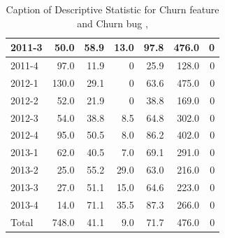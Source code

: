 \documentclass[UKenglish]{ifimaster}  %
\begin{document}
\begin{table}[!htbp]
\begin{adjustwidth}{-1.5cm}{}
{{\begin{tabular}{ | l | r | r | r | r | r | r | }
2011-3 & 50.0 & 58.9 & 13.0 & 97.8 & 476.0 & 0\\ \hline
2011-4 & 97.0 & 11.9 & 0 & 25.9 & 128.0 & 0\\ \hline
2012-1 & 130.0 & 29.1 & 0 & 63.6 & 475.0 & 0\\ \hline
2012-2 & 52.0 & 21.9 & 0 & 38.8 & 169.0 & 0\\ \hline
2012-3 & 54.0 & 38.8 & 8.5 & 64.8 & 302.0 & 0\\ \hline
2012-4 & 95.0 & 50.5 & 8.0 & 86.2 & 402.0 & 0\\ \hline
2013-1 & 62.0 & 40.5 & 7.0 & 69.1 & 291.0 & 0\\ \hline
2013-2 & 25.0 & 55.2 & 29.0 & 63.0 & 216.0 & 0\\ \hline
2013-3 & 27.0 & 51.1 & 15.0 & 64.6 & 223.0 & 0\\ \hline
2013-4 & 14.0 & 71.1 & 35.5 & 87.3 & 266.0 & 0\\ \hline
Total & 748.0 & 41.1 & 9.0 & 71.7 & 476.0 & 0\\ \hline
\end{tabular}
}
}
\end{adjustwidth}
\caption[Optional caption for list of figures]{Caption of Descriptive Statistic for Churn feature and Churn bug , }
\label{DS:3:4}
\end{table}
\end{document}
